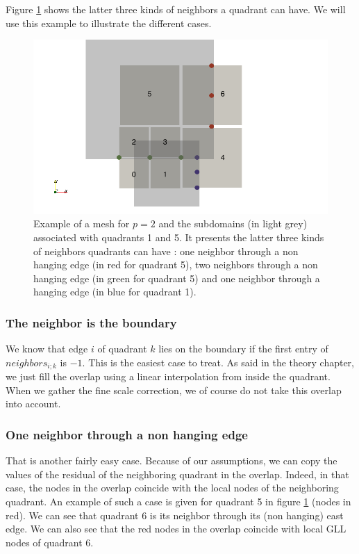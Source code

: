 Figure \ref{fine_ex} shows the latter three kinds of neighbors a quadrant can have. We will use this example to illustrate the different cases. 

\begin{figure}
\centering
\includegraphics[scale=0.5]{Implementation/fine_ex.png}
\caption{Example of a mesh for $p=2$ and the subdomains (in light grey) associated with quadrants 1 and 5. It presents the latter three kinds of neighbors quadrants can have : one neighbor through a non hanging edge (in red for quadrant 5), two neighbors through a non hanging edge (in green for quadrant 5) and one neighbor through a hanging edge (in blue for quadrant 1).}
\label{fine_ex}
\end{figure}

\subsubsection{The neighbor is the boundary}

We know that edge $i$ of quadrant $k$ lies on the boundary if the first entry of $neighbors_{i;k}$ is $-1$. This is the easiest case to treat. As said in the theory chapter, we just fill the overlap using a linear interpolation from inside the quadrant. When we gather the fine scale correction, we of course do not take this overlap into account. 

\subsubsection{One neighbor through a non hanging edge}

That is another fairly easy case. Because of our assumptions, we can copy the values of the residual of the neighboring quadrant in the overlap. Indeed, in that case, the nodes in the overlap coincide with the local nodes of the neighboring quadrant. An example of such a case is given for quadrant 5 in figure \ref{fine_ex} (nodes in red). We can see that quadrant 6 is its neighbor through its (non hanging) east edge. We can also see that the red nodes in the overlap coincide with local GLL nodes of quadrant 6. 

